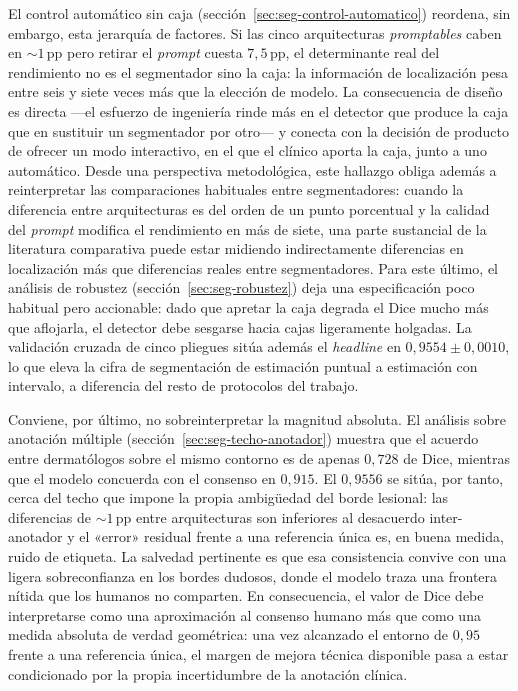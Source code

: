 El control automático sin caja
(sección~\ref{sec:seg-control-automatico}) reordena, sin embargo,
esta jerarquía de factores. Si las cinco arquitecturas
\emph{promptables} caben en $\sim 1$\,pp pero retirar el \emph{prompt}
cuesta $7{,}5$\,pp, el determinante real del rendimiento no es el
segmentador sino la caja: la información de localización pesa entre
seis y siete veces más que la elección de modelo. La consecuencia de
diseño es directa ---el esfuerzo de ingeniería rinde más en el
detector que produce la caja que en sustituir un segmentador por
otro--- y conecta con la decisión de producto de ofrecer un modo
interactivo, en el que el clínico aporta la caja, junto a uno
automático. Desde una perspectiva metodológica, este hallazgo obliga
además a reinterpretar las comparaciones habituales entre segmentadores:
cuando la diferencia entre arquitecturas es del orden de un punto
porcentual y la calidad del \emph{prompt} modifica el rendimiento en más
de siete, una parte sustancial de la literatura comparativa puede estar
midiendo indirectamente diferencias en localización más que diferencias
reales entre segmentadores. Para este último, el análisis de robustez
(sección~\ref{sec:seg-robustez}) deja una especificación poco
habitual pero accionable: dado que apretar la caja degrada el Dice
mucho más que aflojarla, el detector debe sesgarse hacia cajas
ligeramente holgadas. La validación cruzada de cinco pliegues sitúa
además el \emph{headline} en $0{,}9554\pm 0{,}0010$, lo que eleva la
cifra de segmentación de estimación puntual a estimación con
intervalo, a diferencia del resto de protocolos del trabajo.

Conviene, por último, no sobreinterpretar la magnitud absoluta. El
análisis sobre anotación múltiple
(sección~\ref{sec:seg-techo-anotador}) muestra que el acuerdo entre
dermatólogos sobre el mismo contorno es de apenas $0{,}728$ de Dice,
mientras que el modelo concuerda con el consenso en $0{,}915$. El
$0{,}9556$ se sitúa, por tanto, cerca del techo que impone la propia
ambigüedad del borde lesional: las diferencias de $\sim 1$\,pp entre
arquitecturas son inferiores al desacuerdo inter-anotador y el «error»
residual frente a una referencia única es, en buena medida, ruido de
etiqueta. La salvedad pertinente es que esa consistencia convive con
una ligera sobreconfianza en los bordes dudosos, donde el modelo traza
una frontera nítida que los humanos no comparten. En consecuencia, el
valor de Dice debe interpretarse como una aproximación al consenso
humano más que como una medida absoluta de verdad geométrica: una vez
alcanzado el entorno de $0{,}95$ frente a una referencia única, el
margen de mejora técnica disponible pasa a estar condicionado por la
propia incertidumbre de la anotación clínica.


